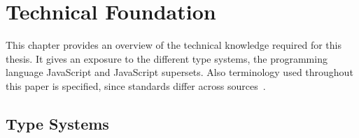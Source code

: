 \chapter{Technical Foundation}
\label{cha:technical-foundation}

This chapter provides an overview of the technical knowledge required for this thesis. It gives an exposure to the different type systems, the programming language JavaScript and JavaScript supersets. Also terminology used throughout this paper is specified, since standards differ across sources~\cite[p.~97-1]{TypeSystems:Cardelli:2004}.


\section{Type Systems}
\label{sec:type-systems}

